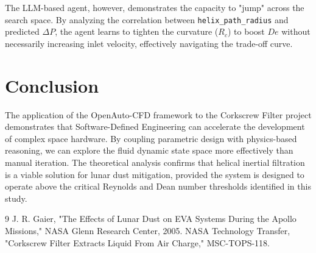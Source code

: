 \documentclass[twocolumn]{article}
\begin{document}
The LLM-based agent, however, demonstrates the capacity to "jump" across the search space. By analyzing the correlation between \texttt{helix\_path\_radius} and predicted $\Delta P$, the agent learns to tighten the curvature ($R_c$) to boost $De$ without necessarily increasing inlet velocity, effectively navigating the trade-off curve.

\section{Conclusion}

The application of the OpenAuto-CFD framework to the Corkscrew Filter project demonstrates that Software-Defined Engineering can accelerate the development of complex space hardware. By coupling parametric design with physics-based reasoning, we can explore the fluid dynamic state space more effectively than manual iteration. The theoretical analysis confirms that helical inertial filtration is a viable solution for lunar dust mitigation, provided the system is designed to operate above the critical Reynolds and Dean number thresholds identified in this study.

\begin{thebibliography}{9}
J. R. Gaier, "The Effects of Lunar Dust on EVA Systems During the Apollo Missions," NASA Glenn Research Center, 2005.
NASA Technology Transfer, "Corkscrew Filter Extracts Liquid From Air Charge," MSC-TOPS-118.
\end{thebibliography}
\end{document}
